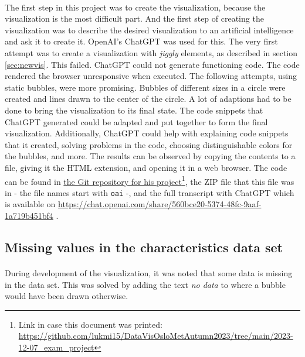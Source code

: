 \documentclass[12pt, a4paper]{article}
\begin{document}
			\paragraph{}
				The first step in this project was to create the visualization, because the visualization is the most difficult part. And the first step of creating the visualization was to describe the desired visualization to an artificial intelligence and ask it to create it. OpenAI's ChatGPT was used for this. The very first attempt was to create a visualization with \textit{jiggly} elements, as described in section \ref{sec:newvis}. This failed. ChatGPT could not generate functioning code. The code rendered the browser unresponsive when executed. The following attempts, using static bubbles, were more promising. Bubbles of different sizes in a circle were created and lines drawn to the center of the circle. A lot of adaptions had to be done to bring the visualization to its final state. The code snippets that ChatGPT generated could be adapted and put together to form the final visualization. Additionally, ChatGPT could help with explaining code snippets that it created, solving problems in the code, choosing distinguishable colors for the bubbles, and more. The results can be observed by copying the contents to a file, giving it the HTML extension, and opening it in a web browser. The code can be found in \href{https://github.com/lukmi15/DataVisOsloMetAutumn2023/tree/main/2023-12-07\_exam\_project}{the Git repository for his project}\footnote{Link in case this document was printed:\\\href{https://github.com/lukmi15/DataVisOsloMetAutumn2023/tree/main/2023-12-07\_exam\_project}{https://github.com/lukmi15/DataVisOsloMetAutumn2023/tree/main/2023-12-07\_exam\_project}}, the ZIP file that this file was in - the file names start with \texttt{oai} -, and the full transcript with ChatGPT which is available on \href{ https://chat.openai.com/share/560bce20-5374-48fc-9aaf-1a719b451bf4}{https://chat.openai.com/share/560bce20-5374-48fc-9aaf-1a719b451bf4} .
		\subsection{Missing values in the characteristics data set}
			\paragraph{}
				During development of the visualization, it was noted that some data is missing in the data set. This was solved by adding the text \textit{no data} to where a bubble would have been drawn otherwise.
\end{document}
